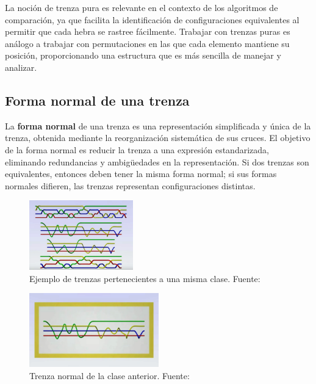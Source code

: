 La noción de trenza pura es relevante en el contexto de los algoritmos de comparación, ya que facilita la identificación de configuraciones equivalentes al permitir que cada hebra se rastree fácilmente. Trabajar con trenzas puras es análogo a trabajar con permutaciones en las que cada elemento mantiene su posición, proporcionando una estructura que es más sencilla de manejar y analizar.

\subsection{Forma normal de una trenza}

La \textbf{forma normal} de una trenza es una representación simplificada y única de la trenza, obtenida mediante la reorganización sistemática de sus cruces. El objetivo de la forma normal es reducir la trenza a una expresión estandarizada, eliminando redundancias y ambigüedades en la representación. Si dos trenzas son equivalentes, entonces deben tener la misma forma normal; si sus formas normales difieren, las trenzas representan configuraciones distintas.

\begin{figure}[h!]
    \centering
    \includegraphics[width=0.4\textwidth]{figures/chapters/3_algoritmos/ejemplos_trenzas_de_una_clase.png}
    \caption{Ejemplo de trenzas pertenecientes a una misma clase. Fuente: \cite{esterdalvitBraidsChapter22013}}
\end{figure}

\begin{figure}[h!]
    \centering
    \includegraphics[width=0.5\textwidth]{figures/chapters/3_algoritmos/trenza_normal.png}
    \caption{Trenza normal de la clase anterior. Fuente: \cite{esterdalvitBraidsChapter22013}}
\end{figure}


